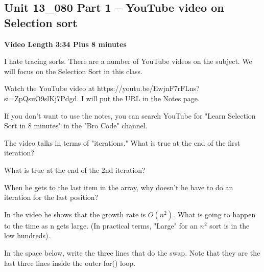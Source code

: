 \documentclass[letterpaper,12pt]{exam}
\newcommand{\unit}{Unit 13}
\begin{document}
\begin{questions}
\section*{\unit\_080 Part 1 -- YouTube video on Selection sort } 
\par{\selectfont\textbf{Video Length 3:34 Plus 8 minutes}}

I hate tracing sorts.  There are a number of YouTube videos on the subject.  We will focus on the Selection Sort in this class.

Watch the YouTube video at https://youtu.be/EwjnF7rFLns?si=ZpQsuO9slKj7Pdgd.  I will put the URL in the Notes page.

If you don't want to use the notes, you can search YouTube for "Learn Selection Sort in 8 minutes" in the "Bro Code" channel.

\begin{samepage}
    \question The video talks in terms of "iterations."  What is true at the end of the first iteration?
    \vspace{5mm}
\end{samepage}
\begin{samepage}
    \question What is true at the end of the 2nd iteration?
    \vspace{5mm}
\end{samepage}

\begin{samepage}
    \question When he gets to the last item in the array, why doesn't he have to do an iteration for the last position?
    \vspace{5mm}
\end{samepage}
\begin{samepage}
    \question In the video he shows that the growth rate is $O(n^2)$.  What is going to happen to the time as n gets large.  (In practical terms, "Large" for an $n^2$ sort is in the low hundreds). 
    \vspace{5mm}
\end{samepage}
\begin{samepage}
    \question In the space below, write the three lines that do the swap.  Note that they are the last three lines inside the outer for() loop.
    \vspace{25mm}
\end{samepage}




\end{questions}
\end{document}
